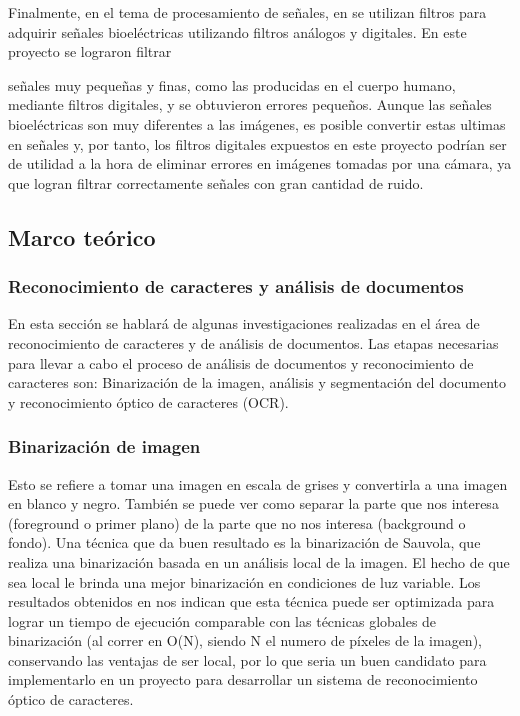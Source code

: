 \documentclass[a4paper, 11pt, oneside]{article}
\begin{document}
	Finalmente, en el tema de procesamiento de señales, en \cite{th5} se utilizan filtros para adquirir 
    señales bioeléctricas utilizando filtros análogos y digitales. En este proyecto se lograron filtrar 

    señales muy pequeñas y finas, como las producidas en el cuerpo humano, mediante filtros digitales, y se
	obtuvieron errores pequeños. Aunque las señales bioeléctricas son muy diferentes a las imágenes, es posible 
    convertir estas ultimas en señales y, por tanto, los filtros digitales expuestos en este proyecto podrían 
    ser de utilidad a la hora de eliminar errores en imágenes tomadas por una cámara, ya que logran filtrar
	correctamente señales con gran cantidad de ruido.\newline
	
	\subsection {Marco teórico}
	\subsubsection{Reconocimiento de caracteres y análisis de documentos}
	En esta sección se hablará de algunas investigaciones realizadas en el área
	de reconocimiento de caracteres y de análisis de documentos.
	Las etapas necesarias para llevar a cabo el proceso de análisis de documentos
	y reconocimiento de caracteres son: Binarización de la imagen, análisis y
	segmentación del documento y reconocimiento óptico de caracteres (OCR).
	
	\subsubsection{Binarización de imagen}
	Esto se refiere a tomar una imagen en escala de grises y convertirla a una 
	imagen en blanco y negro. También se puede ver como separar la parte que nos interesa
	(foreground o primer plano) de la parte que no nos interesa (background o fondo).
	Una técnica que da buen resultado es la binarización de Sauvola,
	que realiza una binarización basada en un análisis local de la imagen. El hecho de
	que sea local le brinda una mejor binarización en condiciones de luz variable. Los 
    resultados obtenidos en\cite{ocropus2} nos indican que esta técnica puede ser
    optimizada para lograr un tiempo de ejecución comparable con las técnicas globales de 
    binarización (al correr en O(N), siendo N el numero de píxeles de la imagen), conservando
	las ventajas de ser local, por lo que seria un buen candidato para implementarlo en un 
    proyecto para desarrollar un sistema de reconocimiento óptico de caracteres.
	
\end{document}
